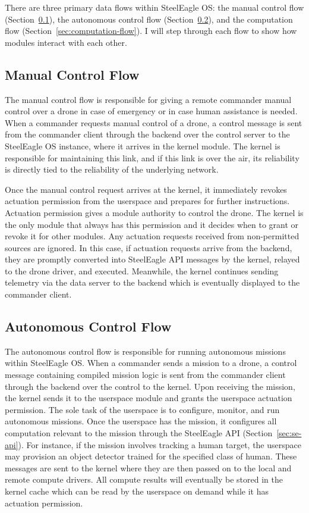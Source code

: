 There are three primary data flows within SteelEagle OS: the manual control flow (Section~\ref{sec:manual-flow}), the autonomous control flow (Section~\ref{sec:autonomous-flow}), and the computation flow (Section~\ref{sec:computation-flow}). I will step through each flow to show how modules interact with each other. 

\subsection{Manual Control Flow}
\label{sec:manual-flow}
The manual control flow is responsible for giving a remote commander manual control over a drone in case of emergency or in case human assistance is needed. When a commander requests manual control of a drone, a control message is sent from the commander client through the backend over the control server to the SteelEagle OS instance, where it arrives in the kernel module. The kernel is responsible for maintaining this link, and if this link is over the air, its reliability is directly tied to the reliability of the underlying network. 

Once the manual control request arrives at the kernel, it immediately revokes actuation permission from the userspace and prepares for further instructions. Actuation permission gives a module authority to control the drone. The kernel is the only module that always has this permission and it decides when to grant or revoke it for other modules. Any actuation requests received from non-permitted sources are ignored. In this case, if actuation requests arrive from the backend, they are promptly converted into SteelEagle API messages by the kernel, relayed to the drone driver, and executed. Meanwhile, the kernel continues sending telemetry via the data server to the backend which is eventually displayed to the commander client.

\subsection{Autonomous Control Flow}
\label{sec:autonomous-flow}
The autonomous control flow is responsible for running autonomous missions within SteelEagle OS. When a commander sends a mission to a drone, a control message containing compiled mission logic is sent from the commander client through the backend over the control to the kernel. Upon receiving the mission, the kernel sends it to the userspace module and grants the userspace actuation permission.  The sole task of the userspace is to configure, monitor, and run autonomous missions. Once the userspace has the mission, it configures all computation relevant to the mission through the SteelEagle API (Section~\ref{sec:se-api}). For instance, if the mission involves tracking a human target, the userspace may provision an object detector trained for the specified class of human. These messages are sent to the kernel where they are then passed on to the local and remote compute drivers. All compute results will eventually be stored in the kernel cache which can be read by the userspace on demand while it has actuation permission.

